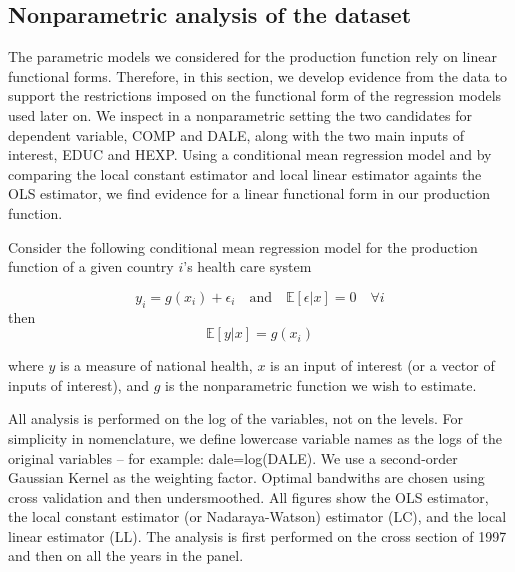 \documentclass[12pt,a4paper]{article}\usepackage[]{graphicx}\usepackage[]{color}
\begin{document}





\subsection{Nonparametric analysis of the dataset}
The parametric models we considered for the production function rely on linear functional forms. Therefore, in this section, we develop evidence from the data to support the restrictions imposed on the functional form of the regression models used later on. We inspect in a nonparametric setting the two candidates for dependent variable, COMP and DALE, along with the two main inputs of interest, EDUC and HEXP. Using a conditional mean regression model and by comparing the local constant estimator and local linear estimator againts the OLS estimator, we find evidence for a linear functional form in our production function. 

Consider the following conditional mean regression model for the production function of a given country $i$'s health care system

$$
y_i = g(x_i) + \epsilon_i \quad \textrm{and} \quad \mathbb{E}[\epsilon|x]=0 \quad \forall i
$$
then
$$
\mathbb{E}[y|x]=g(x_i)
$$

where $y$ is a measure of national health, $x$ is an input of interest (or a vector of inputs of interest), and $g$ is the nonparametric function we wish to estimate.

All analysis is performed on the log of the variables, not on the levels. For simplicity in nomenclature, we define lowercase variable names as the logs of the original variables -- for example: dale=log(DALE). We use a second-order Gaussian Kernel as the weighting factor. Optimal bandwiths are chosen using cross validation and then undersmoothed. All figures show the OLS estimator, the local constant estimator (or Nadaraya-Watson) estimator (LC), and the local linear estimator (LL). The analysis is first performed on the cross section of 1997 and then on all the years in the panel.
\end{document}
